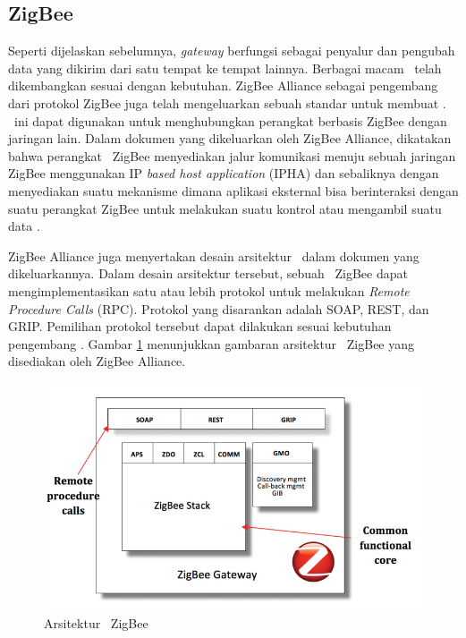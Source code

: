 \subsection{ZigBee \Gateway}

Seperti dijelaskan sebelumnya, \textit{gateway} berfungsi sebagai penyalur dan pengubah data yang dikirim dari satu tempat ke tempat lainnya. Berbagai macam \gateway~telah dikembangkan sesuai dengan kebutuhan. ZigBee Alliance sebagai pengembang dari protokol ZigBee juga telah mengeluarkan sebuah standar untuk membuat \gateway. \Gateway~ini dapat digunakan untuk menghubungkan perangkat berbasis ZigBee dengan jaringan lain. Dalam dokumen yang dikeluarkan oleh ZigBee Alliance, dikatakan bahwa perangkat \gateway~ZigBee menyediakan jalur komunikasi menuju sebuah jaringan ZigBee menggunakan IP \textit{based host application} (IPHA) dan sebaliknya dengan menyediakan suatu mekanisme dimana aplikasi eksternal bisa berinteraksi dengan suatu perangkat ZigBee untuk melakukan suatu kontrol atau mengambil suatu data \cite{zigbeegateway}.

ZigBee Alliance juga menyertakan desain arsitektur \gateway~dalam dokumen yang dikeluarkannya. Dalam desain arsitektur tersebut, sebuah \gateway~ZigBee dapat mengimplementasikan satu atau lebih protokol untuk melakukan \textit{Remote Procedure Calls} (RPC). Protokol yang disarankan adalah SOAP, REST, dan GRIP. Pemilihan protokol tersebut dapat dilakukan sesuai kebutuhan pengembang \cite{zigbeeGateway2}. Gambar \ref{fig:arsitektur-zigbee} menunjukkan gambaran arsitektur \gateway~ZigBee yang disediakan oleh ZigBee Alliance.

\begin{figure}
	\centering
	\includegraphics[width=.9\textwidth]{pics/arsitektur-zigbee-gateway.PNG}
	\caption{Arsitektur \Gateway~ZigBee\cite{zigbeeGateway2}}
	\label{fig:arsitektur-zigbee}
\end{figure}

